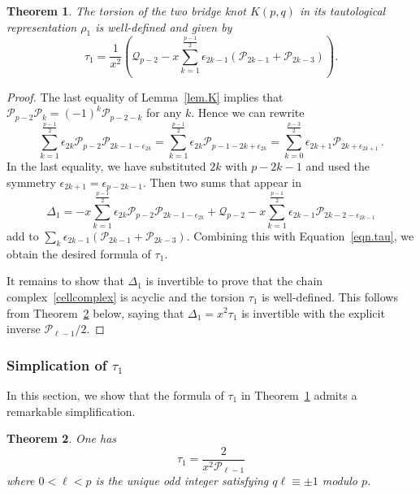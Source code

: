 \documentclass{amsart}
\def\calP{\mathcal{P}}
\def\calQ{\mathcal{Q}}
\newtheorem{Theorem}{Theorem}[section]
\theoremstyle{definition}
\begin{document}



\begin{Theorem}
\label{torfunda}
The torsion of the two bridge knot $K(p,q)$ in its tautological representation $\rho_1$ is well-defined and given by $$\tau_1= \frac{1}{x^2}\left(\calQ_{p-2}-x\sum_{k=1}^{\frac{p-1}{2}}\epsilon_{2k-1}(\calP_{2k-1}+\calP_{2k-3})\right).$$
\end{Theorem}
\begin{proof}
The last equality of Lemma~\ref{lem.K} implies that
$\calP_{p-2}\calP_k=(-1)^k\calP_{p-2-k}$ for any $k$.
Hence we can rewrite
$$\sum_{k=1}^{\frac{p-1}{2}} \epsilon_{2k} \calP_{p-2} \calP_{2k-1-\epsilon_{2k}}=\sum_{k=1}^{\frac{p-1}{2}}\epsilon_{2k}\calP_{p-1-2k+\epsilon_{2k}}=\sum_{k=0}^{\frac{p-3}{2}}\epsilon_{2k+1}\calP_{2k+\epsilon_{2k+1}} \, .$$
In the last equality, we have substituted $2k$ with $p-2k-1$ and used the symmetry $\epsilon_{2k+1}=\epsilon_{p-2k-1}$. Then two sums that appear in $$\Delta_1= -x\sum_{k=1}^{\frac{p-1}{2}}\epsilon_{2k} \calP_{p-2} \calP_{2k-1-\epsilon_{2k}}+\calQ_{p-2}-x\sum_{k=1}^{\frac{p-1}{2}}\epsilon_{2k-1}\calP_{2k-2-\epsilon_{2k-1}} $$ add to $\sum_k\epsilon_{2k-1}(\calP_{2k-1}+\calP_{2k-3})$. Combining this with Equation~\eqref{eqn.tau}, we obtain the desired formula of $\tau_1$.

It remains to show that $\Delta_1$ is invertible to prove that the chain complex~\eqref{cellcomplex} is acyclic and the torsion $\tau_1$ is well-defined. This follows from Theorem~\ref{thm.simp} below, saying that $\Delta_1=x^2\tau_1$ is invertible with the explicit inverse $\calP_{\ell-1}/2$. 
\end{proof}

\subsubsection{Simplication of $\tau_1$}

In this section, we show that the formula of $\tau_1$ in Theorem~\ref{torfunda} admits a remarkable simplification.
\begin{Theorem}
\label{thm.simp}
One has 
\begin{equation*}
    \tau_1=\frac{2}{x^2 \calP_{\ell-1}}
\end{equation*}
where $0<\ell<p$ is the unique odd integer satisfying $q\ell \equiv \pm 1$ modulo $p$.
\end{Theorem}
\end{document}
